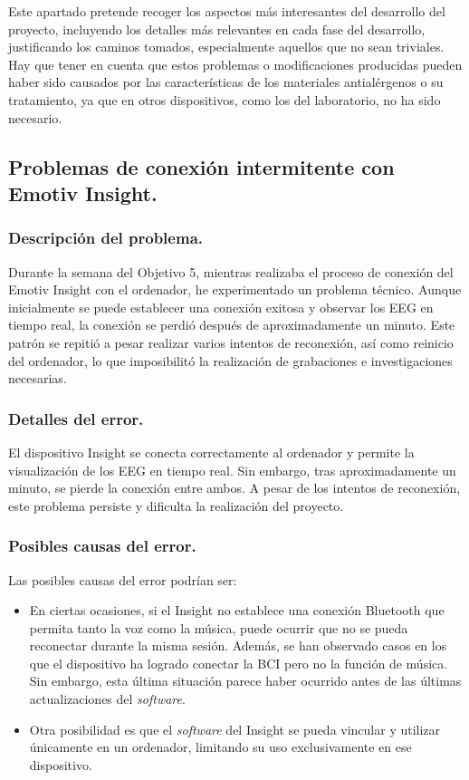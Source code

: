 Este apartado pretende recoger los aspectos más interesantes del desarrollo del proyecto, incluyendo los detalles más relevantes en cada fase del desarrollo, justificando los caminos tomados, especialmente aquellos que no sean triviales. Hay que tener en cuenta que estos problemas o modificaciones producidas pueden haber sido causados por las características de los materiales antialérgenos o su tratamiento, ya que en otros dispositivos, como los del laboratorio, no ha sido necesario.

\subsection{Problemas de conexión intermitente con Emotiv Insight.}
\subsubsection{Descripción del problema.}
Durante la semana del Objetivo 5, mientras realizaba el proceso de conexión del Emotiv Insight con el ordenador, he experimentado un problema técnico. Aunque inicialmente se puede establecer una conexión exitosa y observar los EEG en tiempo real, la conexión se perdió después de aproximadamente un minuto. Este patrón se repitió a pesar realizar varios intentos de reconexión, así como reinicio del ordenador, lo que imposibilitó la realización de grabaciones e investigaciones necesarias.

\subsubsection{Detalles del error.}
El dispositivo Insight se conecta correctamente al ordenador y permite la visualización de los EEG en tiempo real. Sin embargo, tras aproximadamente un minuto, se pierde la conexión entre ambos. A pesar de los intentos de reconexión, este problema persiste y dificulta la realización del proyecto.

\subsubsection{Posibles causas del error.}
Las posibles causas del error podrían ser:
\begin{itemize}
    \item En ciertas ocasiones, si el Insight no establece una conexión Bluetooth que permita tanto la voz como la música, puede ocurrir que no se pueda reconectar durante la misma sesión. Además, se han observado casos en los que el dispositivo ha logrado conectar la BCI pero no la función de música. Sin embargo, esta última situación parece haber ocurrido antes de las últimas actualizaciones del \textit{software}.
    \item Otra posibilidad es que el \textit{software} del Insight se pueda vincular y utilizar únicamente en un ordenador, limitando su uso exclusivamente en ese dispositivo.
\end{itemize}

